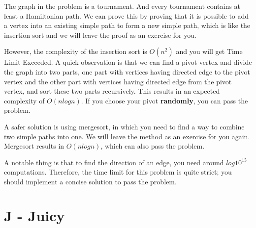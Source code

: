 \documentclass{article}
\begin{document}
The graph in the problem is a tournament. And every tournament contains at least a Hamiltonian path. We can prove this by proving that it is possible to add a vertex into an existing simple path to form a new simple path, which is like the insertion sort and we will leave the proof as an exercise for you. 

\par
However, the complexity of the insertion sort is $O(n^2)$ and you will get Time Limit Exceeded. A quick observation is that we can find a pivot vertex and divide the graph into two parts, one part with vertices having directed edge to the pivot vertex and the other part with vertices having directed edge from the pivot vertex, and sort these two parts recursively. This results in an expected complexity of $O(nlogn)$. If you choose your pivot \textbf{randomly}, you can pass the problem.

\par
A safer solution is using mergesort, in which you need to find a way to combine two simple paths into one. We will leave the method as an exercise for you again. Mergesort results in $O(nlogn)$, which can also pass the problem.

\par
A notable thing is that to find the direction of an edge, you need around $log10^{15}$ computations. Therefore, the time limit for this problem is quite strict; you should implement a concise solution to pass the problem.

\section*{J - Juicy}
\end{document}
